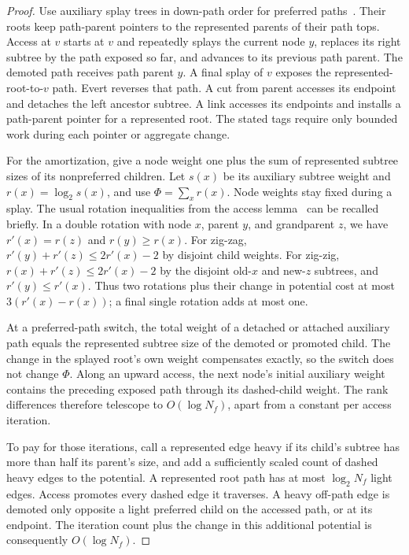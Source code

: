 \begin{proof}
Use auxiliary splay trees in down-path order for preferred
paths~\cite[Section~6]{SplayTrees1985}. Their
roots keep path-parent pointers to the represented parents of their path
tops.  Access at $v$ starts at $v$ and repeatedly splays the current node
$y$, replaces its right subtree by the path exposed so far, and advances
to its previous path parent.  The demoted path receives path parent $y$.
A final splay of $v$ exposes the represented-root-to-$v$ path.  Evert
reverses that path.  A cut from parent accesses its endpoint and detaches
the left ancestor subtree.  A link accesses its endpoints and installs a
path-parent pointer for a represented root.  The stated tags require
only bounded work during each pointer or aggregate change.

For the amortization, give a node weight one plus the sum of represented
subtree sizes of its nonpreferred children.  Let $s(x)$ be its auxiliary
subtree weight and $r(x)=\log_2 s(x)$, and use
$\Phi=\sum_x r(x)$.  Node weights stay fixed during a splay.  The usual
rotation inequalities from the access lemma~\cite[Lemma~1]{SplayTrees1985}
can be recalled briefly.  In a double rotation
with node $x$, parent $y$, and grandparent $z$, we have $r'(x)=r(z)$ and
$r(y)\ge r(x)$.  For zig-zag,
$r'(y)+r'(z)\le2r'(x)-2$ by disjoint child weights.  For zig-zig,
$r(x)+r'(z)\le2r'(x)-2$ by the disjoint old-$x$ and new-$z$ subtrees,
and $r'(y)\le r'(x)$.  Thus two rotations plus their change in potential
cost at most $3(r'(x)-r(x))$; a final single rotation adds at most one.

At a preferred-path switch, the total weight of a detached or attached
auxiliary path equals the represented subtree size of the demoted or
promoted child.  The change in the splayed root's own weight compensates
exactly, so the switch does not change $\Phi$.  Along an upward access,
the next node's initial auxiliary weight contains the preceding exposed
path through its dashed-child weight.  The rank differences therefore
telescope to $O(\log N_f)$, apart from a constant per access iteration.

To pay for those iterations, call a represented edge heavy if its
child's subtree has more than half its parent's size, and add a
sufficiently scaled count of dashed heavy edges to the potential.
A represented root path has at most $\log_2 N_f$ light edges.  Access
promotes every dashed edge it traverses.  A heavy off-path edge is
demoted only opposite a light preferred child on the accessed path, or
at its endpoint.  The iteration count plus the change in this additional
potential is consequently $O(\log N_f)$.


\end{proof}
